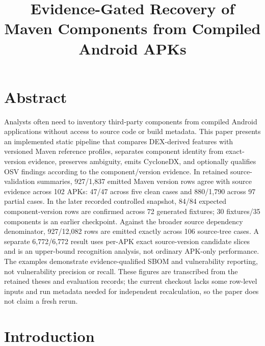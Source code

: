 \documentclass[10pt,twocolumn]{article}
\title{Evidence-Gated Recovery of Maven Components from Compiled Android APKs}
\author{}
\date{}
\begin{document}
\maketitle
\section{Abstract}
Analysts often need to inventory third-party components from compiled Android applications without access to source code or build metadata. This paper presents an implemented static pipeline that compares DEX-derived features with versioned Maven reference profiles, separates component identity from exact-version evidence, preserves ambiguity, emits CycloneDX, and optionally qualifies OSV findings according to the component/version evidence. In retained source-validation summaries, 927/1,837 emitted Maven version rows agree with source evidence across 102 APKs: 47/47 across five clean cases and 880/1,790 across 97 partial cases. In the later recorded controlled snapshot, 84/84 expected component-version rows are confirmed across 72 generated fixtures; 30 fixtures/35 components is an earlier checkpoint. Against the broader source dependency denominator, 927/12,082 rows are emitted exactly across 106 source-tree cases. A separate 6,772/6,772 result uses per-APK exact source-version candidate slices and is an upper-bound recognition analysis, not ordinary APK-only performance. The examples demonstrate evidence-qualified SBOM and vulnerability reporting, not vulnerability precision or recall. These figures are transcribed from the retained theses and evaluation records; the current checkout lacks some row-level inputs and run metadata needed for independent recalculation, so the paper does not claim a fresh rerun.
\section{Introduction}
\end{document}
